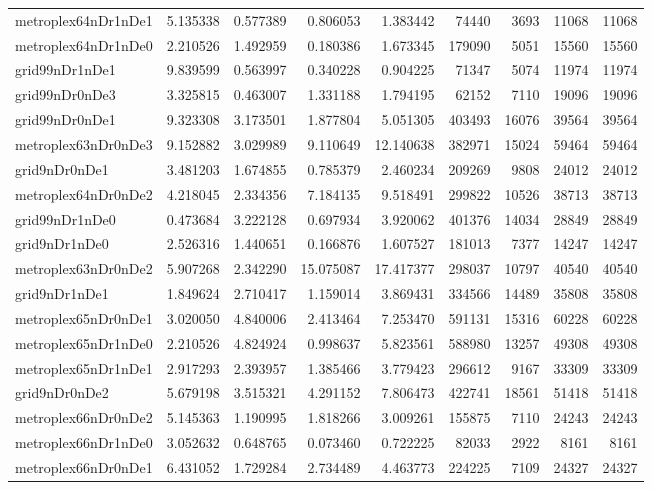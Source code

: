 \begin{longtable}{|l|r|r|r|r|r|r|r|r|}
metroplex64nDr1nDe1 & 5.135338 & 0.577389 & 0.806053 & 1.383442 & 74440 & 3693 & 11068 & 11068 \\
metroplex64nDr1nDe0 & 2.210526 & 1.492959 & 0.180386 & 1.673345 & 179090 & 5051 & 15560 & 15560 \\
grid99nDr1nDe1 & 9.839599 & 0.563997 & 0.340228 & 0.904225 & 71347 & 5074 & 11974 & 11974 \\
grid99nDr0nDe3 & 3.325815 & 0.463007 & 1.331188 & 1.794195 & 62152 & 7110 & 19096 & 19096 \\
grid99nDr0nDe1 & 9.323308 & 3.173501 & 1.877804 & 5.051305 & 403493 & 16076 & 39564 & 39564 \\
metroplex63nDr0nDe3 & 9.152882 & 3.029989 & 9.110649 & 12.140638 & 382971 & 15024 & 59464 & 59464 \\
grid9nDr0nDe1 & 3.481203 & 1.674855 & 0.785379 & 2.460234 & 209269 & 9808 & 24012 & 24012 \\
metroplex64nDr0nDe2 & 4.218045 & 2.334356 & 7.184135 & 9.518491 & 299822 & 10526 & 38713 & 38713 \\
grid99nDr1nDe0 & 0.473684 & 3.222128 & 0.697934 & 3.920062 & 401376 & 14034 & 28849 & 28849 \\
grid9nDr1nDe0 & 2.526316 & 1.440651 & 0.166876 & 1.607527 & 181013 & 7377 & 14247 & 14247 \\
metroplex63nDr0nDe2 & 5.907268 & 2.342290 & 15.075087 & 17.417377 & 298037 & 10797 & 40540 & 40540 \\
grid9nDr1nDe1 & 1.849624 & 2.710417 & 1.159014 & 3.869431 & 334566 & 14489 & 35808 & 35808 \\
metroplex65nDr0nDe1 & 3.020050 & 4.840006 & 2.413464 & 7.253470 & 591131 & 15316 & 60228 & 60228 \\
metroplex65nDr1nDe0 & 2.210526 & 4.824924 & 0.998637 & 5.823561 & 588980 & 13257 & 49308 & 49308 \\
metroplex65nDr1nDe1 & 2.917293 & 2.393957 & 1.385466 & 3.779423 & 296612 & 9167 & 33309 & 33309 \\
grid9nDr0nDe2 & 5.679198 & 3.515321 & 4.291152 & 7.806473 & 422741 & 18561 & 51418 & 51418 \\
metroplex66nDr0nDe2 & 5.145363 & 1.190995 & 1.818266 & 3.009261 & 155875 & 7110 & 24243 & 24243 \\
metroplex66nDr1nDe0 & 3.052632 & 0.648765 & 0.073460 & 0.722225 & 82033 & 2922 & 8161 & 8161 \\
metroplex66nDr0nDe1 & 6.431052 & 1.729284 & 2.734489 & 4.463773 & 224225 & 7109 & 24327 & 24327 \\

\end{longtable}
